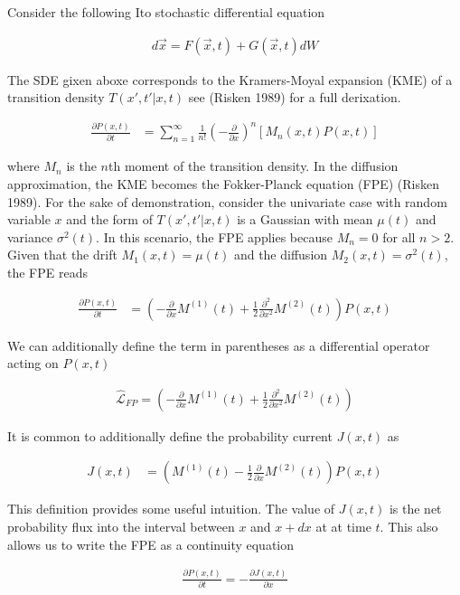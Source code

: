 \documentclass{ucetd}
\begin{document}
\begin{appendices}
Consider the following Ito stochastic differential equation 

\begin{align*}
d\vec{x} = F(\vec{x},t) + G(\vec{x},t)dW
\end{align*}

The SDE gixen aboxe corresponds to the Kramers-Moyal expansion (KME) of a transition density $T(x',t'|x,t)$ see (Risken 1989) for a full derixation.

\begin{align}
\frac{\partial P(x,t)}{\partial t}  &= \sum_{n=1}^{\infty} \frac{1}{n!}\left(-\frac{\partial}{\partial x}\right)^{n} \left[M_{n}(x,t)P(x,t)\right]
\end{align}

where $M_{n}$ is the $n$th moment of the transition density. In the diffusion approximation, the KME becomes the Fokker-Planck equation (FPE) (Risken 1989). For the sake of demonstration, consider the univariate case with random variable $x$ and the form of $T(x',t'|x,t)$ is a Gaussian with mean $\mu(t)$ and variance $\sigma^{2}(t)$. In this scenario, the FPE applies because $M_{n} = 0$ for all $n > 2$. Given that the drift $M_{1}(x,t) = \mu(t)$ and the diffusion $M_{2}(x,t) = \sigma^{2}(t)$, the FPE reads

\begin{align}
\frac{\partial P(x,t)}{\partial t}  &= \left(-\frac{\partial}{\partial x}M^{(1)}(t) + \frac{1}{2}\frac{\partial^{2}}{\partial x^{2}}M^{(2)}(t)\right)P(x,t)
\end{align}

We can additionally define the term in parentheses as a differential operator acting on $P(x,t)$

\begin{align}
\hat{\mathcal{L}}_{FP} = \left(-\frac{\partial}{\partial x}M^{(1)}(t) + \frac{1}{2}\frac{\partial^{2}}{\partial x^{2}}M^{(2)}(t)\right)
\end{align}

It is common to additionally define the probability current $J(x,t)$ as 

\begin{align}
J(x,t)  &= \left(M^{(1)}(t) - \frac{1}{2}\frac{\partial}{\partial x}M^{(2)}(t)\right)P(x,t)
\end{align}

This definition provides some useful intuition. The value of $J(x,t)$ is the net probability flux into the interval between $x$ and $x+dx$ at at time $t$. This also allows us to write the FPE as a continuity equation

\begin{align}
\frac{\partial P(x,t)}{\partial t} = -\frac{\partial J(x,t)}{\partial x}
\end{align}
\end{appendices}
\end{document}
